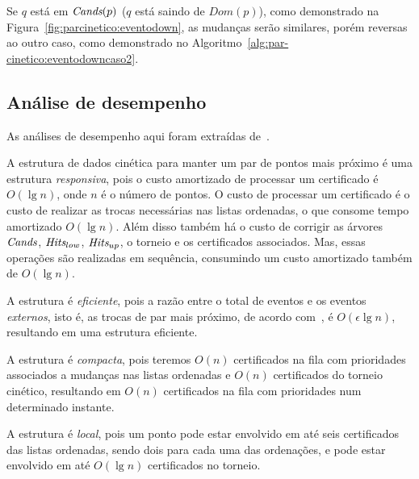 

Se $q$ está em $\textit{Cands}(p)$ ($q$ está saindo de $Dom(p)$), como demonstrado na
Figura~\ref{fig:parcinetico:eventodown}, as mudanças serão similares, porém reversas ao outro
caso, como demonstrado no Algoritmo~\ref{alg:par-cinetico:eventodowncaso2}.



\FloatBarrier

\subsection{Análise de desempenho}\label{subsec:par:analise-de-desempenho}

As análises de desempenho aqui foram extraídas de~\cite{eduardo}.

A estrutura de dados cinética para manter um par de pontos mais próximo é uma estrutura
\textit{responsiva}, pois o custo amortizado de processar um certificado é $O(\lg{n})$, onde $n$ é
o número de pontos.
O custo de processar um certificado é o custo de realizar as trocas necessárias nas listas
ordenadas, o que consome tempo amortizado $O(\lg{n})$.
Além disso também há o custo de corrigir as árvores $\textit{Cands}$, $\textit{Hits}_{low}$, $\textit{Hits}_{up}$, o
torneio e os certificados associados.
Mas, essas operações são realizadas em sequência, consumindo um custo amortizado também de
$O(\lg{n})$.

A estrutura é \textit{eficiente}, pois a razão entre o total de eventos e os eventos
\textit{externos}, isto é, as trocas de par mais próximo, de acordo com~\cite{eduardo}, é
$O(\epsilon \lg{n})$, resultando em uma estrutura eficiente.

A estrutura é \textit{compacta}, pois teremos $O(n)$ certificados na fila com prioridades
associados a mudanças nas listas ordenadas e $O(n)$ certificados do torneio cinético, resultando
em $O(n)$ certificados na fila com prioridades num determinado instante.

A estrutura é \textit{local}, pois um ponto pode estar envolvido em até seis certificados das
listas ordenadas, sendo dois para cada uma das ordenações, e pode estar envolvido em até
$O(\lg{n})$ certificados no torneio.
